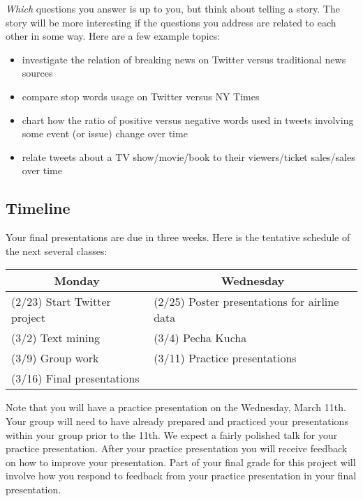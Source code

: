 \documentclass[11pt, oneside]{article}   	%
\begin{document}
{\em Which} questions you answer is up to you, but
think about telling a story. The story will be more interesting if the
questions you address are related to each other in some way.
Here are a few example topics:
\begin{itemize}
\item investigate the relation of breaking news on Twitter versus traditional
  news sources
\item compare stop words usage on Twitter versus NY Times
\item chart how the ratio of positive versus negative words used in tweets
  involving some event (or issue) change over time
\item relate tweets about a TV show/movie/book to their viewers/ticket sales/sales
  over time
\end{itemize}


\subsection*{Timeline}

Your final presentations are due in three weeks.  Here is the tentative schedule
of the next several classes:

\begin{table}[h]
\centering
\begin{tabular}{@{}l|l@{}}
\toprule
\multicolumn{1}{c|}{Monday} & \multicolumn{1}{c}{Wednesday}                 \\
\hline
(2/23) Start Twitter project & (2/25) Poster presentations for airline data \\
(3/2) Text mining            & (3/4) Pecha Kucha                            \\
(3/9) Group work             & (3/11) Practice presentations                \\
(3/16) Final presentations   &                                              \\                                       
\bottomrule
\end{tabular}
\end{table}

Note that you will have a practice presentation on the Wednesday, March 11th.
Your group will need to have already prepared and practiced your presentations
within your group prior to the 11th.  We expect a fairly polished talk for your
practice presentation.  After your practice presentation you will receive feedback
on how to improve your presentation.  Part of your final grade for this project
will involve how you respond to feedback from your practice presentation in your
final presentation.
\end{document}
